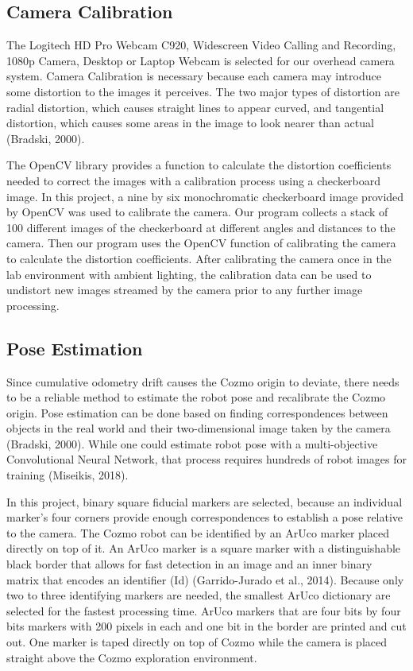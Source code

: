 \documentclass[jou,apacite]{apa6}
\begin{document}
\subsection{Camera Calibration}
The Logitech HD Pro Webcam C920, Widescreen Video Calling and Recording, 1080p Camera, Desktop or Laptop Webcam is selected for our overhead camera system. Camera Calibration is necessary because each camera may introduce some distortion to the images it perceives. The two major types of distortion are radial distortion, which causes straight lines to appear curved, and tangential distortion, which causes some areas in the image to look nearer than actual (Bradski, 2000). 

The OpenCV library provides a function to calculate the distortion coefficients needed to correct the images with a calibration process using a checkerboard image. In this project, a nine by six monochromatic checkerboard image provided by OpenCV was used to calibrate the camera. Our program collects a stack of 100 different images of the checkerboard at different angles and distances to the camera. Then our program uses the OpenCV function of calibrating the camera to calculate the distortion coefficients. 
After calibrating the camera once in the lab environment with ambient lighting, the calibration data can be used to undistort new images streamed by the camera prior to any further image processing.

\subsection{Pose Estimation}

Since cumulative odometry drift causes the Cozmo origin to deviate, there needs to be a reliable method to estimate the robot pose and recalibrate the Cozmo origin. Pose estimation can be done based on finding correspondences between objects in the real world and their two-dimensional image taken by the camera (Bradski, 2000). While one could estimate robot pose with a multi-objective Convolutional Neural Network, that process requires hundreds of robot images for training (Miseikis, 2018).

In this project, binary square fiducial markers are selected, because an individual marker’s four corners provide enough correspondences to establish a pose relative to the camera. The Cozmo robot can be identified by an ArUco marker placed directly on top of it. An ArUco marker is a square marker with a distinguishable black border that allows for fast detection in an image and an inner binary matrix that encodes an identifier (Id) (Garrido-Jurado et al., 2014). Because only two to three identifying markers are needed, the smallest ArUco dictionary are selected for the fastest processing time. ArUco markers that are four bits by four bits markers with 200 pixels in each and one bit in the border are printed and cut out. One marker is taped directly on top of Cozmo while the camera is placed straight above the Cozmo exploration environment.
\end{document}
